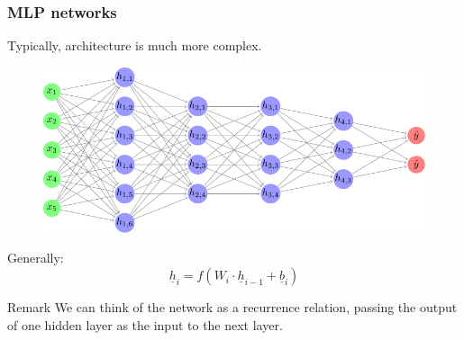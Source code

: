 \documentclass{beamer}
\begin{document}

\begin{frame}
    \frametitle{MLP networks}
    Typically, architecture is much more complex.
    \begin{figure}
        \centering
        \includegraphics[height=0.4\textheight]{./figures/mlp/main.pdf}
    \end{figure} \pause
    Generally:
    \[\underline{h}_i = f(W_i \cdot \underline{h}_{i - 1} + \underline{b}_i)\]
    \begin{block}{Remark}
        We can think of the network as a recurrence relation, passing the output of one hidden layer as the input to the next layer.
    \end{block}
\end{frame}
\end{document}
